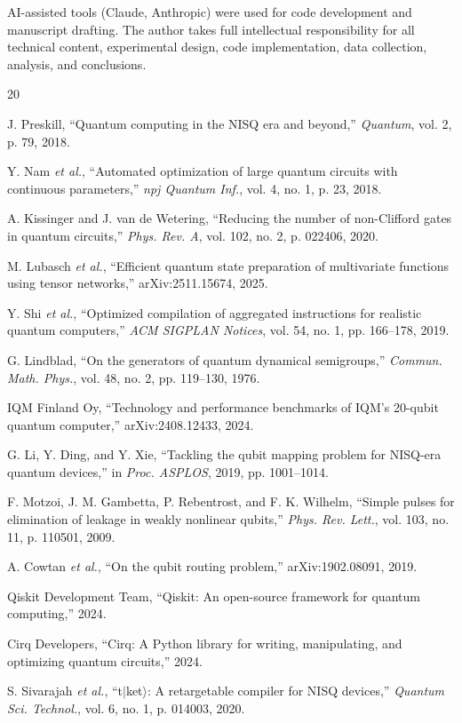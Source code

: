 \documentclass[journal]{IEEEtran}
\begin{document}
AI-assisted tools (Claude, Anthropic) were used for code development and manuscript drafting. The author takes full intellectual responsibility for all technical content, experimental design, code implementation, data collection, analysis, and conclusions.

\begin{thebibliography}{20}

J. Preskill, ``Quantum computing in the NISQ era and beyond,'' \textit{Quantum}, vol. 2, p. 79, 2018.

Y. Nam \textit{et al.}, ``Automated optimization of large quantum circuits with continuous parameters,'' \textit{npj Quantum Inf.}, vol. 4, no. 1, p. 23, 2018.

A. Kissinger and J. van de Wetering, ``Reducing the number of non-Clifford gates in quantum circuits,'' \textit{Phys. Rev. A}, vol. 102, no. 2, p. 022406, 2020.

M. Lubasch \textit{et al.}, ``Efficient quantum state preparation of multivariate functions using tensor networks,'' arXiv:2511.15674, 2025.

Y. Shi \textit{et al.}, ``Optimized compilation of aggregated instructions for realistic quantum computers,'' \textit{ACM SIGPLAN Notices}, vol. 54, no. 1, pp. 166--178, 2019.

G. Lindblad, ``On the generators of quantum dynamical semigroups,'' \textit{Commun. Math. Phys.}, vol. 48, no. 2, pp. 119--130, 1976.

IQM Finland Oy, ``Technology and performance benchmarks of IQM's 20-qubit quantum computer,'' arXiv:2408.12433, 2024.

G. Li, Y. Ding, and Y. Xie, ``Tackling the qubit mapping problem for NISQ-era quantum devices,'' in \textit{Proc. ASPLOS}, 2019, pp. 1001--1014.

F. Motzoi, J. M. Gambetta, P. Rebentrost, and F. K. Wilhelm, ``Simple pulses for elimination of leakage in weakly nonlinear qubits,'' \textit{Phys. Rev. Lett.}, vol. 103, no. 11, p. 110501, 2009.

A. Cowtan \textit{et al.}, ``On the qubit routing problem,'' arXiv:1902.08091, 2019.

Qiskit Development Team, ``Qiskit: An open-source framework for quantum computing,'' 2024.

Cirq Developers, ``Cirq: A Python library for writing, manipulating, and optimizing quantum circuits,'' 2024.

S. Sivarajah \textit{et al.}, ``t$|$ket$\rangle$: A retargetable compiler for NISQ devices,'' \textit{Quantum Sci. Technol.}, vol. 6, no. 1, p. 014003, 2020.

\end{thebibliography}
\end{document}

